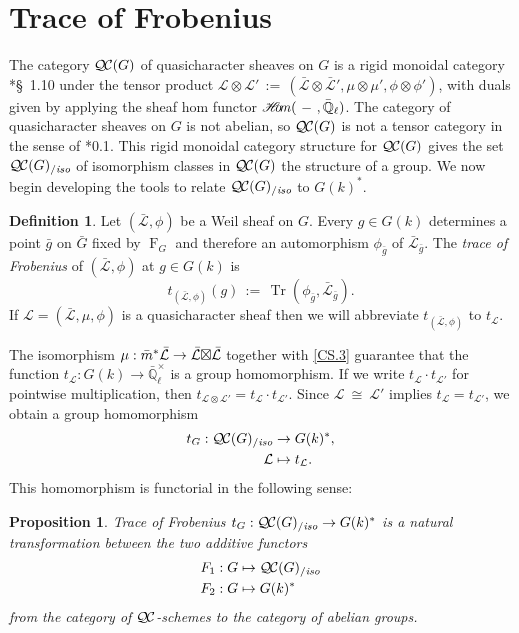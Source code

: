 \documentclass[11pt]{amsart}
\theoremstyle{plain}
\newtheorem{proposition}[theorem]{Proposition}
\theoremstyle{definition}
\newtheorem{definition}[theorem]{Definition}
\theoremstyle{remark}
\newcommand{\EE}{\mathbb{\bar Q}_\ell}
\newcommand{\Fq}{k}
\newcommand{\EEx}{\EE^\times}
\newcommand{\Frob}[1]{\operatorname{F}_{#1}}
\DeclareMathOperator{\trace}{Tr}
\newcommand{\cdef}[1]{ {#1}\index{#1} }
\newcommand{\sheafHom}{{\mathscr{H}\hskip-4pt{\it o}\hskip-2pt{\it m}}}
\newcommand{\ceq}{{\, :=\, }}
\newcommand{\iso}{{\ \cong\ }}
\newcommand{\qcs}[1]{{\mathcal{#1}}}
\newcommand{\gqcs}[1]{{\mathcal{\bar #1}}}
\newcommand{\QC}{{\mathcal{Q\hskip-0.8pt C}}}
\newcommand{\QCiso}[1]{\QC(#1)_{/\textit{iso}}}
\newcommand{\trFrob}[1]{t_{#1}}
\newcommand{\bg}{\bar{g}}
\newcommand{\bm}{\bar{m}}
\newcommand{\bG}{\bar{G}}
\newcommand{\tight}[3]{\hspace{-#1pt}{#2}\hspace{-#3pt}}
\newcommand{\LxL}{\text{$\gqcs{L} \tight{0}{\boxtimes}{0} \gqcs{L}$}}
\begin{document}
\section{Trace of Frobenius}\label{sec:Frob}

The category $\QC(G)$ of quasicharacter sheaves on $G$ is a rigid monoidal category
\cite{etingof:09a}*{\S~1.10} under the tensor product
$\qcs{L} \otimes \qcs{L'} \ceq (\gqcs{L}\otimes\gqcs{L'}, \mu\otimes\mu', \phi\otimes \phi')$,
with duals given by applying the sheaf hom functor 
$\sheafHom(\ - \ ,\EE)$.
The category of quasicharacter sheaves on $G$ is not abelian, so $\QC(G)$
is not a tensor category in the sense of \cite{deligne:02a}*{0.1}.
This rigid monoidal category structure for $\QC(G)$ gives the set $\QCiso{G}$
of isomorphism classes in $\QC(G)$ the structure of a group.
We now begin developing the tools to relate $\QCiso{G}$ to $G(\Fq)^*$.

\begin{definition}\label{def:trFrob}
Let $(\gqcs{L},\phi)$ be a Weil sheaf on $G$. Every $g\in G(\Fq)$
determines a point $\bg$ on $\bG$ fixed by $\Frob{G}$ and
therefore an automorphism $\phi_{\bg}$ of $\gqcs{L}_{\bg}$. The \emph{trace of Frobenius} of $(\gqcs{L},\phi)$ at $g\in G(\Fq)$ is 
\[
\trFrob{(\gqcs{L},\phi)}(g) \ceq \trace(\phi_{\bg}, \gqcs{L}_{\bg}).
\]
If $\qcs{L} = (\gqcs{L},\mu,\phi)$ is a quasicharacter sheaf
then we will abbreviate $\trFrob{(\gqcs{L},\phi)}$ to $\trFrob{\qcs{L}}$.
\end{definition}

The isomorphism $\mu : \bm^* \gqcs{L} \to \LxL$ together with 
\ref{CS.3} guarantee
that the function $\trFrob{\qcs{L}} : G(\Fq)\to \EEx$ is a group homomorphism.  If we write
$\trFrob{\qcs{L}} \cdot \trFrob{\qcs{L'}}$ for pointwise multiplication, then 
 $\trFrob{\qcs{L}\otimes \qcs{L'}} = \trFrob{\qcs{L}} \cdot \trFrob{\qcs{L'}}$.
Since $\qcs{L} \iso \qcs{L'}$ implies $\trFrob{\qcs{L}} = \trFrob{\qcs{L'}}$,
we obtain a group homomorphism
\begin{align*}
\cdef{\trFrob{G}} : \QCiso{G} &\to G(\Fq)^*, \\
\qcs{L} &\mapsto \trFrob{\qcs{L}}.
\end{align*}
This homomorphism is functorial in the following sense:

\begin{proposition}\label{prop:functorialG}
Trace of Frobenius $\trFrob{G} : \QCiso{G} \to G(\Fq)^*$ is a natural transformation 
between the two additive functors 
\begin{align*}
F_1 : G &\mapsto \QCiso{G} \\
F_2 : G &\mapsto G(\Fq)^*
\end{align*}
from the category of $\QC$-schemes to the category of abelian groups.
\end{proposition}
\end{document}
